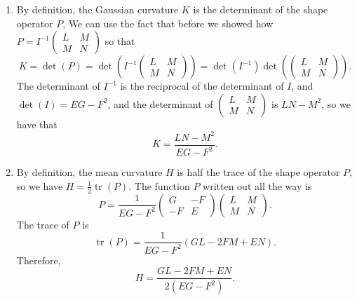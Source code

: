 \documentclass[12pt]{article}
\begin{document}
\begin{enumerate}
        \[
          P(\mathbf{w}_1)^T I \mathbf{w}_2 = \mathbf{w}_1^T \begin{pmatrix} L & M \\ M & N\end{pmatrix} \mathbf{w}_2.
        \]
        We can divide by \(\mathbf{w}_2\) on both sides and then transpose to get
        \[
          I P(\mathbf{w}_1) = \begin{pmatrix} L & M \\ M & N\end{pmatrix} \mathbf{w}_1.
        \]
        Since \(I\) is invertible, we have that
        \[
          P(\mathbf{w}_1) = I^{-1} \begin{pmatrix} L & M \\ M & N\end{pmatrix} \mathbf{w}_1.
        \]

  \item By definition, the Gaussian curvature \(K\) is the determinant of the shape operator \(P\), We can use the fact that before we showed how \(P = I^{-1}\begin{pmatrix} L & M \\ M & N\end{pmatrix}\) so that
        \[
          K = \det(P) = \det\left(I^{-1}\begin{pmatrix} L & M \\ M & N\end{pmatrix}\right) = \det(I^{-1})\det\left(\begin{pmatrix} L & M \\ M & N\end{pmatrix}\right).
        \]
        The determinant of \(I^{-1}\) is the reciprocal of the determinant of \(I\), and \(\det(I) = EG-F^2\), and the determinant of \(\begin{pmatrix} L & M \\ M & N\end{pmatrix}\) is \(LN-M^2\), so we have that
        \[
          K = \frac{LN-M^2}{EG-F^2}.
        \]

  \item By definition, the mean curvature \(H\) is half the trace of the shape operator \(P\), so we have
        \(
        H = \frac{1}{2} \operatorname{tr}(P).
        \)
        The function \(P\) written out all the way is
        \[
          P = \frac{1}{EG-F^2}\begin{pmatrix} G & -F \\ -F & E \end{pmatrix}\begin{pmatrix} L & M \\ M & N\end{pmatrix}.
        \]
        The trace of \(P\) is
        \[
          \operatorname{tr}(P) = \frac{1}{EG-F^2} (GL - 2FM + EN).
        \]
        Therefore,
        \[
          H = \frac{GL - 2FM + EN}{2(EG-F^2)}.
        \]


\end{enumerate}
\end{document}
